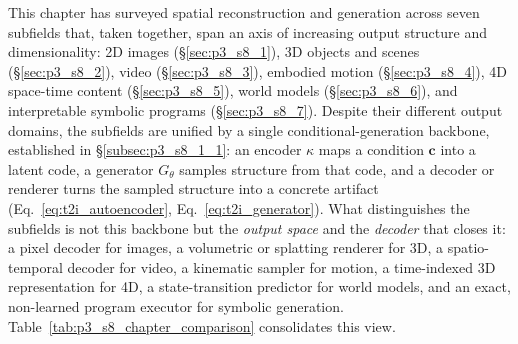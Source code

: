 This chapter has surveyed spatial reconstruction and generation across seven subfields that, taken together, span an axis of increasing output structure and dimensionality: 2D images (§\ref{sec:p3_s8_1}), 3D objects and scenes (§\ref{sec:p3_s8_2}), video (§\ref{sec:p3_s8_3}), embodied motion (§\ref{sec:p3_s8_4}), 4D space-time content (§\ref{sec:p3_s8_5}), world models (§\ref{sec:p3_s8_6}), and interpretable symbolic programs (§\ref{sec:p3_s8_7}). Despite their different output domains, the subfields are unified by a single conditional-generation backbone, established in §\ref{subsec:p3_s8_1_1}: an encoder $\kappa$ maps a condition $\mathbf{c}$ into a latent code, a generator $G_\theta$ samples structure from that code, and a decoder or renderer turns the sampled structure into a concrete artifact (Eq.~\eqref{eq:t2i_autoencoder}, Eq.~\eqref{eq:t2i_generator}). What distinguishes the subfields is not this backbone but the \emph{output space} and the \emph{decoder} that closes it: a pixel decoder for images, a volumetric or splatting renderer for 3D, a spatio-temporal decoder for video, a kinematic sampler for motion, a time-indexed 3D representation for 4D, a state-transition predictor for world models, and an exact, non-learned program executor for symbolic generation. Table~\ref{tab:p3_s8_chapter_comparison} consolidates this view.

